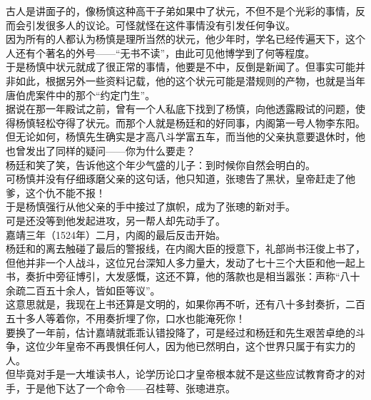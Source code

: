 \begin{multicols}{\theparacolNo}
古人是讲面子的，像杨慎这种高干子弟如果中了状元，不但不是个光彩的事情，反而会引发很多人的议论。可怪就怪在这件事情没有引发任何争议。\\

因为所有的人都认为杨慎是理所当然的状元，他少年时，学名已经传遍天下，这个人还有个著名的外号——“无书不读”，由此可见他博学到了何等程度。\\

于是杨慎中状元就成了很正常的事情，他要是不中，反倒是新闻了。但事实可能并非如此，根据另外一些资料记载，他的这个状元可能是潜规则的产物，也就是当年唐伯虎案件中的那个“约定门生”。\\

据说在那一年殿试之前，曾有一个人私底下找到了杨慎，向他透露殿试的问题，使得杨慎轻松夺得了状元。而那个人就是杨廷和的好同事，内阁第一号人物李东阳。\\

但无论如何，杨慎先生确实是才高八斗学富五车，而当他的父亲执意要退休时，他也曾发出了同样的疑问——你为什么要走？\\

杨廷和笑了笑，告诉他这个年少气盛的儿子：到时候你自然会明白的。\\

可杨慎并没有仔细琢磨父亲的这句话，他只知道，张璁告了黑状，皇帝赶走了他爹，这个仇不能不报！\\

于是杨慎强行从他父亲的手中接过了旗帜，成为了张璁的新对手。\\

可是还没等到他发起进攻，另一帮人却先动手了。\\

嘉靖三年（1524年）二月，内阁的最后反击开始。\\

杨廷和的离去触碰了最后的警报线，在内阁大臣的授意下，礼部尚书汪俊上书了，但他并非一个人战斗，这位兄台深知人多力量大，发动了七十三个大臣和他一起上书，奏折中旁征博引，大发感慨，这还不算，他的落款也是相当嚣张：声称“八十余疏二百五十余人，皆如臣等议”。\\

这意思就是，我现在上书还算是文明的，如果你再不听，还有八十多封奏折，二百五十多人等着你，不用奏折埋了你，口水也能淹死你！\\

要换了一年前，估计嘉靖就乖乖认错投降了，可是经过和杨廷和先生艰苦卓绝的斗争，这位少年皇帝不再畏惧任何人，因为他已然明白，这个世界只属于有实力的人。\\

但毕竟对手是一大堆读书人，论学历论口才皇帝根本就不是这些应试教育奇才的对手，于是他下达了一个命令——召桂萼、张璁进京。\\


\end{multicols}
